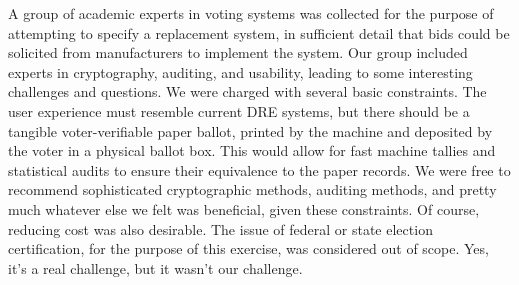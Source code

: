 A group of academic experts in voting systems was collected for the
purpose of attempting to specify a replacement system, in sufficient
detail that bids could be solicited from manufacturers to implement
the system. Our group included experts in cryptography, auditing, and
usability, leading to some interesting challenges and questions. We
were charged with several basic constraints. The user experience must
resemble current DRE systems, but there should be a tangible
voter-verifiable paper ballot, printed by the machine and deposited by
the voter in a physical ballot box. This would allow for fast machine
tallies and statistical audits to ensure their equivalence to the
paper records. We were free to recommend sophisticated cryptographic
methods, auditing methods, and pretty much whatever else we felt was
beneficial, given these constraints. Of course, reducing cost was also
desirable. The issue of federal or state election certification, for
the purpose of this exercise, was considered out of scope. Yes, it's a
real challenge, but it wasn't our challenge.

